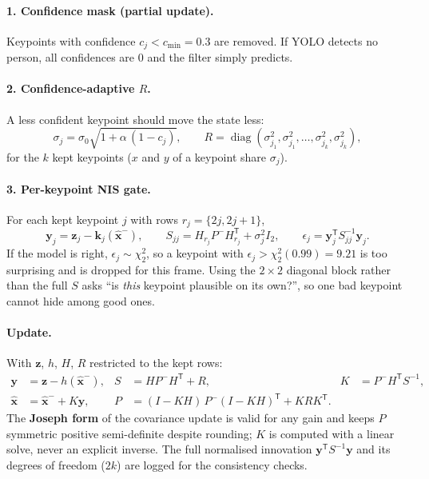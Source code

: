 \documentclass[12pt,a4paper]{article}
\newcommand{\T}{^{\mathsf{T}}}
\begin{document}
\paragraph{1. Confidence mask (partial update).} Keypoints with confidence $c_j < c_{\min}=0.3$ are
removed. If YOLO detects no person, all confidences are 0 and the filter simply predicts.

\paragraph{2. Confidence-adaptive $R$.} A less confident keypoint should move the state less:
\begin{equation}
  \sigma_j = \sigma_0\sqrt{1+\alpha\,(1-c_j)},\qquad
  R = \operatorname{diag}(\sigma_{j_1}^2,\sigma_{j_1}^2,\dots,\sigma_{j_k}^2,\sigma_{j_k}^2),
\end{equation}
for the $k$ kept keypoints ($x$ and $y$ of a keypoint share $\sigma_j$).

\paragraph{3. Per-keypoint NIS gate.} For each kept keypoint $j$ with rows $r_j=\{2j,2j{+}1\}$,
\begin{equation}
  \mathbf{y}_j = \mathbf{z}_j - \mathbf{k}_j(\hat{\mathbf{x}}^-),\qquad
  S_{jj} = H_{r_j}P^-H_{r_j}\T + \sigma_j^2 I_2,\qquad
  \epsilon_j = \mathbf{y}_j\T S_{jj}^{-1}\mathbf{y}_j .
\end{equation}
If the model is right, $\epsilon_j\sim\chi^2_2$, so a keypoint with $\epsilon_j > \chi^2_2(0.99) = 9.21$
is too surprising and is dropped for this frame. Using the $2\times2$ diagonal block rather than the full
$S$ asks ``is \emph{this} keypoint plausible on its own?'', so one bad keypoint cannot hide among good ones.

\paragraph{Update.} With $\mathbf{z}$, $h$, $H$, $R$ restricted to the kept rows:
\begin{align}
  \mathbf{y} &= \mathbf{z} - h(\hat{\mathbf{x}}^-), & S &= HP^-H\T + R, & K &= P^-H\T S^{-1},\\
  \hat{\mathbf{x}} &= \hat{\mathbf{x}}^- + K\mathbf{y}, & P &= (I-KH)\,P^-(I-KH)\T + KRK\T .
\end{align}
The \textbf{Joseph form} of the covariance update is valid for any gain and keeps $P$ symmetric positive
semi-definite despite rounding; $K$ is computed with a linear solve, never an explicit inverse. The full
normalised innovation $\mathbf{y}\T S^{-1}\mathbf{y}$ and its degrees of freedom ($2k$) are logged for the
consistency checks.
\end{document}
